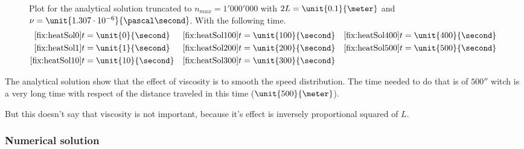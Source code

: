 \begin{figure}
\caption[.]{
Plot for the analytical solution truncated to $n_{max}=1'000'000$ with $2L=\unit{0.1}{\meter}$ and $\nu=\unit{1.307\cdot 10^{-6}}{\pascal\second}$.
With the following time.
\begin{align*}
\ref{fix:heatSol0} t&=\unit{0}{\second}& \ref{fix:heatSol100} t&=\unit{100}{\second}&\ref{fix:heatSol400} t&=\unit{400}{\second}&\\
\ref{fix:heatSol1} t&=\unit{1}{\second}&\ref{fix:heatSol200} t&=\unit{200}{\second}&\ref{fix:heatSol500} t&=\unit{500}{\second}&\\
\ref{fix:heatSol10} t&=\unit{10}{\second}&\ref{fix:heatSol300} t&=\unit{300}{\second}&\\
\end{align*}
}
\label{fixed:solheat:fig:sol}
\end{figure}

The analytical solution show that the effect of viscosity is to smooth the speed distribution. The time needed to do that is of $\unit{500}{\second}$
witch is a very long time with respect of the distance traveled in this time ($\unit{500}{\meter}$).

But this doesn't say that viscosity is not important, because it's effect is inversely proportional squared of $L$.

\subsubsection{Numerical solution}

